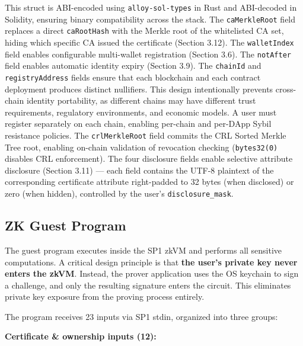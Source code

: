 \documentclass[11pt, a4paper]{article}
\begin{document}
This struct is ABI-encoded using \texttt{alloy-sol-types} in Rust and
ABI-decoded in Solidity, ensuring binary compatibility across the stack.
The \texttt{caMerkleRoot} field replaces a direct \texttt{caRootHash}
with the Merkle root of the whitelisted CA set, hiding which specific CA
issued the certificate (Section 3.12). The \texttt{walletIndex} field
enables configurable multi-wallet registration (Section 3.6). The
\texttt{notAfter} field enables automatic identity expiry (Section 3.9).
The \texttt{chainId} and \texttt{registryAddress} fields ensure that
each blockchain and each contract deployment produces distinct
nullifiers. This design intentionally prevents cross-chain identity
portability, as different chains may have different trust requirements,
regulatory environments, and economic models. A user must register
separately on each chain, enabling per-chain and per-DApp Sybil
resistance policies. The \texttt{crlMerkleRoot} field commits the CRL
Sorted Merkle Tree root, enabling on-chain validation of revocation
checking (\texttt{bytes32(0)} disables CRL enforcement). The four
disclosure fields enable selective attribute disclosure (Section
3.11) --- each field contains the UTF-8 plaintext of the corresponding
certificate attribute right-padded to 32 bytes (when
disclosed) or zero (when hidden), controlled by the user's
\texttt{disclosure\_mask}.

\subsection{ZK Guest Program}\label{zk-guest-program}

The guest program executes inside the SP1 zkVM and performs all
sensitive computations. A critical design principle is that \textbf{the
user's private key never enters the zkVM}. Instead, the prover application
uses the OS keychain to sign a challenge, and only the resulting
signature enters the circuit. This eliminates private key exposure from
the proving process entirely.

The program receives 23 inputs via SP1 stdin, organized into three
groups:

\textbf{Certificate \& ownership inputs (12):}
\end{document}
